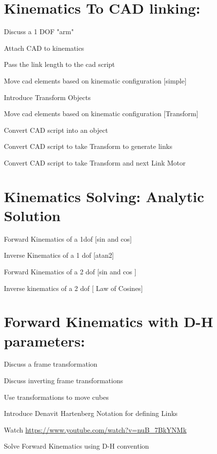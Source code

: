 \documentclass{article}
\begin{document}
\section{Kinematics To CAD linking:}
\begin{todolist}
	\item Discuss a 1 DOF "arm"
	\item Attach CAD to kinematics
	\item Pass the link length to the cad script
	\item Move cad elements based on kinematic configuration [simple]
	\item Introduce Transform Objects
	\item Move cad elements based on kinematic configuration [Transform]
	\item Convert CAD script into an object
	\item Convert CAD script to take Transform to generate links
	\item Convert CAD script to take Transform and next Link Motor
\end{todolist}

\section{Kinematics Solving: Analytic Solution}
\begin{todolist}
	\item Forward Kinematics of a 1dof [sin and cos]
	\item Inverse Kinematics of a 1 dof [atan2]
	\item Forward Kinematics of a 2 dof [sin and cos ]
	\item Inverse kinematics of a 2 dof [ Law of Cosines] 
\end{todolist}
\section{Forward Kinematics with D-H parameters:}
\begin{todolist}
	\item Discuss a frame transformation
	\item Discuss inverting frame transformations
	\item Use transformations to move cubes
	\item Introduce Denavit Hartenberg Notation for defining Links
	\item Watch  \url{https://www.youtube.com/watch?v=nuB_7BkYNMk}
	\item Solve Forward Kinematics using D-H convention
\end{todolist}
\end{document}
